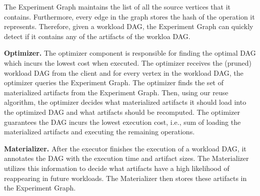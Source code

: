 The Experiment Graph maintains the list of all the source vertices that it contains.
Furthermore, every edge in the graph stores the hash of the operation it represents.
Therefore, given a workload DAG, the Experiment Graph can quickly detect if it contains any of the artifacts of the workloa DAG.

\textbf{Optimizer. }
The optimizer component is responsible for finding the optimal DAG which incurs the lowest cost when executed.
The optimizer receives the (pruned) workload DAG from the client and for every vertex in the workload DAG, the optimizer queries the Experiment Graph.
The optimizer finds the set of materialized artifacts from the Experiment Graph.
Then, using our reuse algorithm, the optimizer decides what materialized artifacts it should load into the optimized DAG and what artifacts should be recomputed.
The optimizer guarantees the DAG incurs the lowest execution cost, i.e., sum of loading the materialized artifacts and executing the remaining operations.

\textbf{Materializer.}
After the executor finishes the execution of a workload DAG, it annotates the DAG with the execution time and artifact sizes.
The Materializer utilizes this information to decide what artifacts have a high likelihood of reappearing in future workloads.
The Materializer then stores these artifacts in the Experiment Graph.


